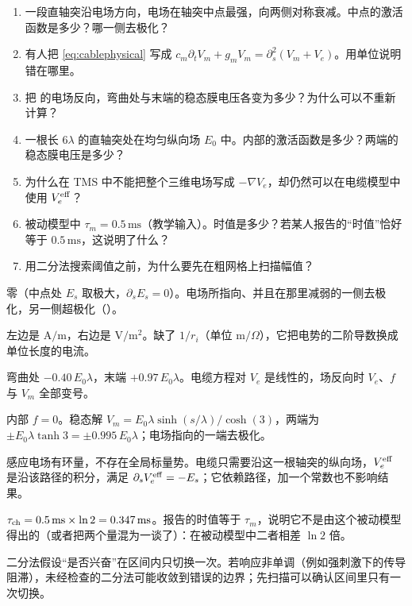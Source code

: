 \begin{selfcheck}
\begin{enumerate}
\item 一段直轴突沿电场方向，电场在轴突中点最强，向两侧对称衰减。中点的激活函数是多少？哪一侧去极化？
\item 有人把 \eqref{eq:cablephysical} 写成 $c_m\partial_tV_m+g_mV_m=\partial_s^2(V_m+V_e)$。用单位说明错在哪里。
\item 把 的电场反向，弯曲处与末端的稳态膜电压各变为多少？为什么可以不重新计算？
\item 一根长 $6\lambda$ 的直轴突处在均匀纵向场 $E_0$ 中。内部的激活函数是多少？两端的稳态膜电压是多少？
\item 为什么在 TMS 中不能把整个三维电场写成 $-\nabla V_e$，却仍然可以在电缆模型中使用 $V_e^{\rm eff}$？
\item 被动模型中 $\tau_m=0.5\,\mathrm{ms}$（教学输入）。时值是多少？若某人报告的“时值”恰好等于 $0.5\,\mathrm{ms}$，这说明了什么？
\item 用二分法搜索阈值之前，为什么要先在粗网格上扫描幅值？
\end{enumerate}
\end{selfcheck}

\begin{answers}
\item 零（中点处 $E_s$ 取极大，$\partial_sE_s=0$）。电场所指向、并且在那里减弱的一侧去极化，另一侧超极化（）。
\item 左边是 $\mathrm{A/m}$，右边是 $\mathrm{V/m^2}$。缺了 $1/r_i$（单位 $\mathrm{m}/\Omega$），它把电势的二阶导数换成单位长度的电流。
\item 弯曲处 $-0.40\,E_0\lambda$，末端 $+0.97\,E_0\lambda$。电缆方程对 $V_e$ 是线性的，场反向时 $V_e$、$f$ 与 $V_m$ 全部变号。
\item 内部 $f=0$。稳态解 $V_m=E_0\lambda\sinh(s/\lambda)/\cosh(3)$，两端为 $\pm E_0\lambda\tanh3=\pm0.995\,E_0\lambda$；电场指向的一端去极化。
\item 感应电场有环量，不存在全局标量势。电缆只需要沿这一根轴突的纵向场，$V_e^{\rm eff}$ 是沿该路径的积分，满足 $\partial_sV_e^{\rm eff}=-E_s$；它依赖路径，加一个常数也不影响结果。
\item $\tau_{\rm ch}=0.5\,\mathrm{ms}\times\ln2=0.347\,\mathrm{ms}$。报告的时值等于 $\tau_m$，说明它不是由这个被动模型得出的（或者把两个量混为一谈了）：在被动模型中二者相差 $\ln2$ 倍。
\item 二分法假设“是否兴奋”在区间内只切换一次。若响应非单调（例如强刺激下的传导阻滞），未经检查的二分法可能收敛到错误的边界；先扫描可以确认区间里只有一次切换。
\end{answers}
